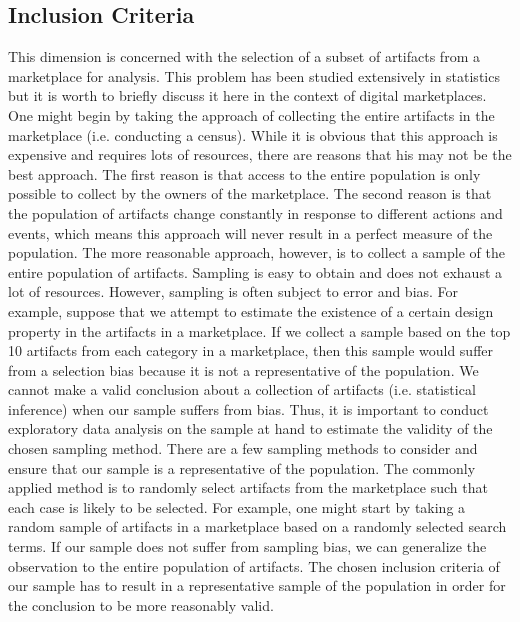 \subsection{Inclusion Criteria}
This dimension is concerned with the selection of a subset of artifacts from a marketplace for analysis.
This problem has been studied extensively in statistics but it is worth to briefly discuss it here in the context of digital marketplaces.
One might begin by taking the approach of collecting the entire artifacts in the marketplace (i.e. conducting a census).
While it is obvious that this approach is expensive and requires lots of resources, there are reasons that his may not be the best approach.
The first reason is that access to the entire population is only possible to collect by the owners of the marketplace.
The second reason is that the population of artifacts change constantly in response to different actions and events, which means this approach will never result in a perfect measure of the population.
The more reasonable approach, however, is to collect a sample of the entire population of artifacts.
Sampling is easy to obtain and does not exhaust a lot of resources.
However,  sampling is often subject to error and bias.
For example, suppose that we attempt to estimate the existence of a certain design property in the artifacts in a marketplace.
If we collect a sample based on the top 10 artifacts from each category in a marketplace, then this sample would suffer from a selection bias because it is not a representative of the population.
We cannot make a valid conclusion about a collection of artifacts (i.e. statistical inference) when our sample suffers from bias.
Thus, it is important to conduct exploratory data analysis on the sample at hand to estimate the validity of the chosen sampling method.
There are a few sampling methods to consider and ensure that our sample is a representative of the population.
The commonly applied method is to randomly select artifacts from the marketplace such that each case is likely to be selected.
For example, one might start by taking a random sample of artifacts in a marketplace based on a randomly selected search terms.
If our sample does not suffer from sampling bias, we can generalize the observation to the entire population of artifacts.
The chosen inclusion criteria of our sample has to result in a representative sample of the population in order for the conclusion to be more reasonably valid.


